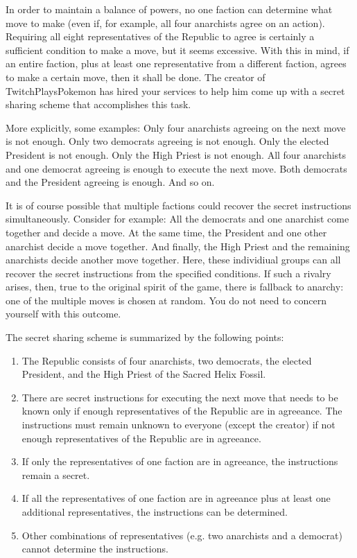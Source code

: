 \documentclass[]{article}
\begin{document}
\begin{qunlist}
In order to maintain a balance of powers, no one faction can determine what move to make (even if, for example, all four anarchists agree on an action). Requiring all eight representatives of the Republic to agree is certainly a sufficient condition to make a move, but it seems excessive. With this in mind, if an entire faction, plus at least one representative from a different faction, agrees to make a certain move, then it shall be done.
The creator of TwitchPlaysPokemon has hired your services to help him come up with a secret sharing scheme that accomplishes this task.

More explicitly, some examples: 
Only four anarchists agreeing on the next move is not enough. 
Only two democrats agreeing is not enough. 
Only the elected President is not enough. 
Only the High Priest is not enough. 
All four anarchists and one democrat agreeing is enough to execute the next move.
Both democrats and the President agreeing is enough.
And so on.

It is of course possible that multiple factions could recover the secret instructions simultaneously.
Consider for example: All the democrats and one anarchist come together and decide a move. 
At the same time, the President and one other anarchist decide a move together. 
And finally, the High Priest and the remaining anarchists decide another move together. 
Here, these individiual groups can all recover the secret instructions from the specified conditions.
If such a rivalry arises, then, true to the original spirit of the game, there is fallback to anarchy: one of the multiple moves is chosen at random.
You do not need to concern yourself with this outcome.

The secret sharing scheme is summarized by the following points:

\begin{enumerate}
\item  The Republic consists of four anarchists, two democrats, the elected President, and the High Priest of the Sacred Helix Fossil.
\item  There are secret instructions for executing the next move that needs to be known only if enough representatives of the Republic are in agreeance. The instructions must remain unknown to everyone (except the creator) if not enough representatives of the Republic are in agreeance.
\item  If only the representatives of one faction are in agreeance, the instructions remain a secret.
\item  If all the representatives of one faction are in agreeance plus at least one additional representatives, the instructions can be determined.
\item  Other combinations of representatives (e.g. two anarchists and a democrat) cannot determine the instructions.
\end{enumerate}



\end{qunlist}
\end{document}
